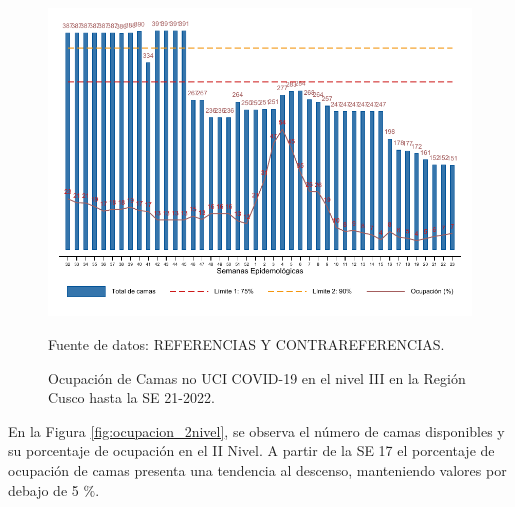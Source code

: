 \documentclass[12pt,a4paper,openany]{book}
\begin{document}
	\begin{figure}[htpb]
		\caption{Ocupación de Camas no UCI COVID-19 en el nivel III en la Región Cusco hasta la SE 21-2022.}\label{fig:ocupacion_3_nivel}
		\begin{center}
			\includegraphics[width=0.95\linewidth]{../figuras/nivel_3.pdf}
		\end{center}
		{\footnotesize {Fuente de datos: REFERENCIAS Y CONTRAREFERENCIAS.}}
	\end{figure}
	
	\clearpage
	
	En la Figura \ref{fig:ocupacion_2nivel}, se observa el número de camas disponibles y su porcentaje de ocupación en el II Nivel. A partir de la SE 17 el porcentaje de ocupación de camas presenta una tendencia al descenso, manteniendo valores por debajo de 5 $\%$.
	
\end{document}

